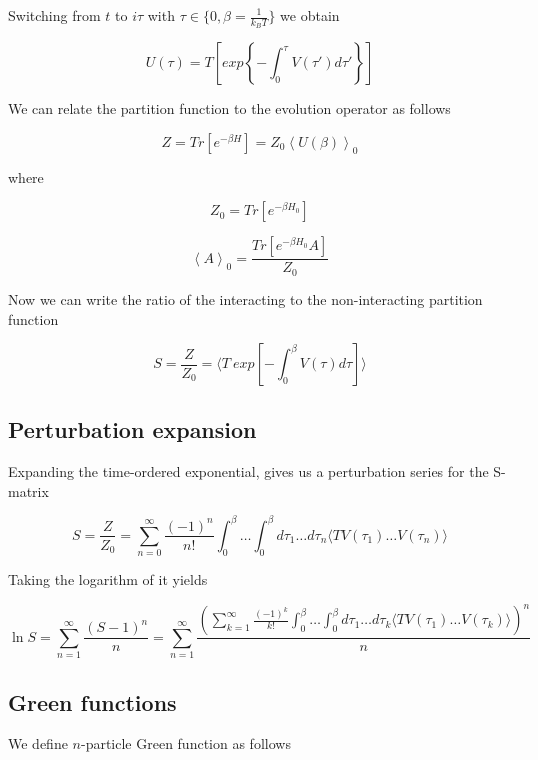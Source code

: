 Switching from $t$ to $i\tau$ with $\tau\in\{0,\beta=\frac{1}{k_B T}\}$ we obtain

\begin{equation} U(\tau) = T\left[exp\left\{-\int_{0}^{\tau}V(\tau')d\tau'\right\}\right] \end{equation}

We can relate the partition function to the evolution operator as follows

\begin{equation} Z = Tr\left[e^{-\beta H}\right] = Z_0\left<U(\beta)\right>_0 \end{equation}

where 

\begin{equation} Z_0 = Tr\left[e^{-\beta H_0}\right] \end{equation}

\begin{equation} \left<A\right>_0 = \frac{Tr\left[e^{-\beta H_0}A\right]}{Z_0} \end{equation}

Now we can write the ratio of the interacting to the non-interacting partition function

\begin{equation} S = \frac{Z}{Z_0} = \langle T\ exp\left[-\int_{0}^{\beta}V(\tau)d\tau\right]\rangle \end{equation}

\subsection{Perturbation expansion}
Expanding the time-ordered exponential, gives us a perturbation series for the S-matrix

\begin{equation} S = \frac{Z}{Z_0} = \sum_{n=0}^{\infty}\frac{(-1)^n}{n!}\int_{0}^{\beta}\dots\int_{0}^{\beta} d\tau_1\dots d\tau_n 
    \langle T V(\tau_1)\dots V(\tau_n) \rangle \end{equation}

Taking the logarithm of it yields

\begin{equation} \ln{S} = \sum_{n=1}^{\infty}\frac{(S-1)^n}{n} = \sum_{n=1}^{\infty}
  \frac{(\sum_{k=1}^{\infty}\frac{(-1)^k}{k!}\int_{0}^{\beta}\dots\int_{0}^{\beta} d\tau_1\dots d\tau_k 
    \langle T V(\tau_1)\dots V(\tau_k) \rangle)^n}{n} \end{equation}

\subsection{Green functions}
We define $n$-particle Green function as follows


